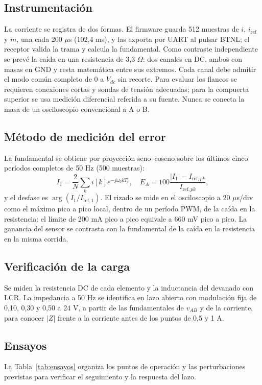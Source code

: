 \documentclass[conference]{IEEEtran}
\begin{document}
\subsection{Instrumentación}
La corriente se registra de dos formas. El firmware guarda 512 muestras de $i$, $i_{\mathrm{ref}}$ y $m$, una cada 200 $\mu$s (102,4 ms), y las exporta por UART al pulsar BTNL; el receptor valida la trama y calcula la fundamental. Como contraste independiente se prevé la caída en una resistencia de 3,3 $\Omega$: dos canales en DC, ambos con masas en GND y resta matemática entre sus extremos. Cada canal debe admitir el modo común completo de 0 a $V_{dc}$ sin recorte. Para evaluar los flancos se requieren conexiones cortas y sondas de tensión adecuadas; para la compuerta superior se usa medición diferencial referida a su fuente. Nunca se conecta la masa de un osciloscopio convencional a A o B.

\newpage
\subsection{Método de medición del error}
La fundamental se obtiene por proyección seno--coseno sobre los últimos cinco períodos completos de 50 Hz (500 muestras):
\begin{equation}
I_1=\frac{2}{N}\sum_{k}i[k]e^{-j\omega_0kT_r},\quad E_A=100\frac{|I_1|-I_{\mathrm{ref},pk}}{I_{\mathrm{ref},pk}},
\end{equation}
y el desfase es $\arg(I_1/I_{\mathrm{ref},1})$. El rizado se mide en el osciloscopio a 20 $\mu$s/div como el máximo pico a pico local, dentro de un período PWM, de la caída en la resistencia: el límite de 200 mA pico a pico equivale a 660 mV pico a pico. La ganancia del sensor se contrasta con la fundamental de la caída en la resistencia en la misma corrida.

\subsection{Verificación de la carga}
Se miden la resistencia DC de cada elemento y la inductancia del devanado con LCR. La impedancia a 50 Hz se identifica en lazo abierto con modulación fija de 0,10, 0,30 y 0,50 a 24 V, a partir de las fundamentales de $v_{AB}$ y de la corriente, para conocer $|Z|$ frente a la corriente antes de los puntos de 0,5 y 1 A.

\subsection{Ensayos}
La Tabla~\ref{tab:ensayos} organiza los puntos de operación y las perturbaciones previstas para verificar el seguimiento y la respuesta del lazo.
\end{document}
